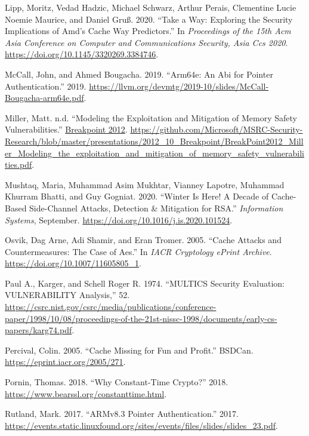 \documentclass[a4paper,]{report}
\begin{document}
\leavevmode\hypertarget{ref-Lipp2020}{}%
Lipp, Moritz, Vedad Hadzic, Michael Schwarz, Arthur Perais, Clementine
Lucie Noemie Maurice, and Daniel Gruß. 2020. ``Take a Way: Exploring the
Security Implications of Amd's Cache Way Predictors.'' In
\emph{Proceedings of the 15th Acm Asia Conference on Computer and
Communications Security, Asia Ccs 2020}.
\url{https://doi.org/10.1145/3320269.3384746}.

\leavevmode\hypertarget{ref-McCall2019}{}%
McCall, John, and Ahmed Bougacha. 2019. ``Arm64e: An Abi for Pointer
Authentication.'' 2019.
\url{https://llvm.org/devmtg/2019-10/slides/McCall-Bougacha-arm64e.pdf}.

\leavevmode\hypertarget{ref-Miller2012}{}%
Miller, Matt. n.d. ``Modeling the Exploitation and Mitigation of Memory
Safety Vulnerabilities.''
\href{https://2012.ruxconbreakpoint.com/}{Breakpoint 2012}.
\url{https://github.com/Microsoft/MSRC-Security-Research/blob/master/presentations/2012_10_Breakpoint/BreakPoint2012_Miller_Modeling_the_exploitation_and_mitigation_of_memory_safety_vulnerabilities.pdf}.

\leavevmode\hypertarget{ref-Mushtaq2020}{}%
Mushtaq, Maria, Muhammad Asim Mukhtar, Vianney Lapotre, Muhammad Khurram
Bhatti, and Guy Gogniat. 2020. ``Winter Is Here! A Decade of Cache-Based
Side-Channel Attacks, Detection \& Mitigation for RSA.''
\emph{Information Systems}, September.
\url{https://doi.org/10.1016/j.is.2020.101524}.

\leavevmode\hypertarget{ref-Osvik2005}{}%
Osvik, Dag Arne, Adi Shamir, and Eran Tromer. 2005. ``Cache Attacks and
Countermeasures: The Case of Aes.'' In \emph{IACR Cryptology ePrint
Archive}. \url{https://doi.org/10.1007/11605805_1}.

\leavevmode\hypertarget{ref-Karger1974}{}%
Paul A., Karger, and Schell Roger R. 1974. ``MULTICS Security
Evaluation: VULNERABILITY Analysis,'' 52.
\url{https://csrc.nist.gov/csrc/media/publications/conference-paper/1998/10/08/proceedings-of-the-21st-nissc-1998/documents/early-cs-papers/karg74.pdf}.

\leavevmode\hypertarget{ref-Percival2005}{}%
Percival, Colin. 2005. ``Cache Missing for Fun and Profit.'' BSDCan.
\url{https://eprint.iacr.org/2005/271}.

\leavevmode\hypertarget{ref-Pornin2018}{}%
Pornin, Thomas. 2018. ``Why Constant-Time Crypto?'' 2018.
\url{https://www.bearssl.org/constanttime.html}.

\leavevmode\hypertarget{ref-Rutland2017}{}%
Rutland, Mark. 2017. ``ARMv8.3 Pointer Authentication.'' 2017.
\url{https://events.static.linuxfound.org/sites/events/files/slides/slides_23.pdf}.
\end{document}
